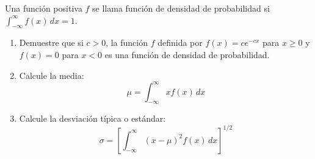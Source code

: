 \item Una función positiva $f$ se llama función de densidad de probabilidad si $\int_{-\infty}^{\infty} f(x) \, dx = 1$.
    \begin{enumerate}
        \item[(a)] Demuestre que si $c > 0$, la función $f$ definida por $f(x) = c e^{-cx}$ para $x \ge 0$ y $f(x) = 0$ para $x < 0$ es una función de densidad de probabilidad.
        \item[(b)] Calcule la media:
        \[ \mu = \int_{-\infty}^{\infty} x f(x) \, dx \]
        \item[(c)] Calcule la desviación típica o estándar:
        \[ \sigma = \left[ \int_{-\infty}^{\infty} (x - \mu)^2 f(x) \, dx \right]^{1/2} \]
    \end{enumerate}
